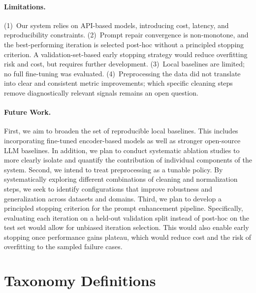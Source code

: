 \documentclass[11pt]{article}
\begin{document}
\paragraph{Limitations.}
(1)~Our system relies on API-based models, introducing cost, latency, and reproducibility constraints.
(2)~Prompt repair convergence is non-monotone, and the best-performing iteration is selected post-hoc without a principled stopping criterion.
A validation-set-based early stopping strategy would reduce overfitting risk and cost, but requires further development.
(3)~Local baselines are limited; no full fine-tuning was evaluated.
(4)~Preprocessing the data did not translate into clear and consistent metric improvements; which specific cleaning steps remove diagnostically relevant signals remains an open question.

\paragraph{Future Work.}

First, we aim to broaden the set of reproducible local baselines. This includes incorporating fine-tuned encoder-based models as well as stronger open-source LLM baselines. In addition, we plan to conduct systematic ablation studies to more clearly isolate and quantify the contribution of individual components of the system.
Second, we intend to treat preprocessing as a tunable policy. By systematically exploring different combinations of cleaning and normalization steps, we seek to identify configurations that improve robustness and generalization across datasets and domains.
Third, we plan to develop a principled stopping criterion for the prompt enhancement pipeline.
Specifically, evaluating each iteration on a held-out validation split instead of post-hoc on the test set would allow for unbiased iteration selection. This would also enable early stopping once performance gains plateau, which would reduce cost and the risk of overfitting to the sampled failure cases.

% 


\appendix

\section{Taxonomy Definitions}
\end{document}
